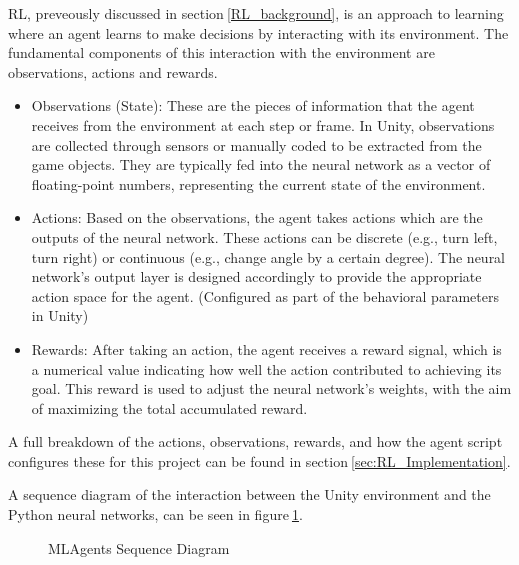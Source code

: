 RL, preveously discussed in section$~$\ref{RL_background}, is an approach to learning where an agent learns to make decisions by interacting with its environment. The fundamental components of this interaction with the environment are observations, actions and rewards.
\begin{itemize}
    \item Observations (State): These are the pieces of information that the agent receives from the environment at each step or frame. In Unity, observations are collected through sensors or manually coded to be extracted from the game objects. They are typically fed into the neural network as a vector of floating-point numbers, representing the current state of the environment.
    \item Actions: Based on the observations, the agent takes actions which are the outputs of the neural network. These actions can be discrete (e.g., turn left, turn right) or continuous (e.g., change angle by a certain degree). The neural network's output layer is designed accordingly to provide the appropriate action space for the agent. (Configured as part of the behavioral parameters in Unity)
    \item Rewards: After taking an action, the agent receives a reward signal, which is a numerical value indicating how well the action contributed to achieving its goal. This reward is used to adjust the neural network's weights, with the aim of maximizing the total accumulated reward.
\end{itemize}
A full breakdown of the actions, observations, rewards, and how the agent script configures these for this project can be found in section$~$\ref{sec:RL_Implementation}.

A sequence diagram of the interaction between the Unity environment and the Python neural networks, can be seen in figure$~$\ref{MLAgents_Seq_Diagram}.

\begin{figure}[h]
    \centering
    \caption{MLAgents Sequence Diagram}\label{MLAgents_Seq_Diagram}
\end{figure}

